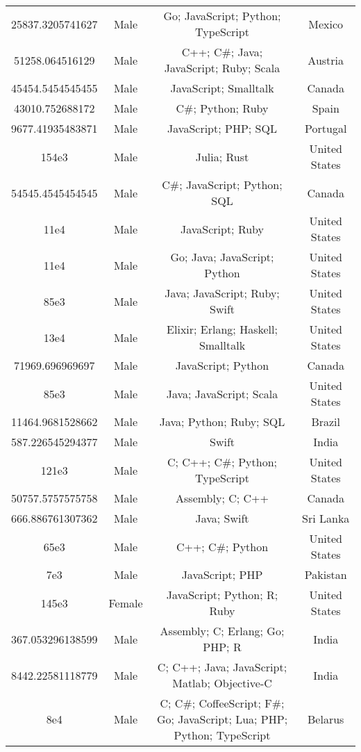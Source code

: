 \begin{center}
\begin{tabular}{ |c|c|c|c| }
25837.3205741627  &  Male  &  Go; JavaScript; Python; TypeScript  &  Mexico  \\ 
51258.064516129  &  Male  &  C++; C\#; Java; JavaScript; Ruby; Scala  &  Austria  \\ 
45454.5454545455  &  Male  &  JavaScript; Smalltalk  &  Canada  \\ 
43010.752688172  &  Male  &  C\#; Python; Ruby  &  Spain  \\ 
9677.41935483871  &  Male  &  JavaScript; PHP; SQL  &  Portugal  \\ 
154e3  &  Male  &  Julia; Rust  &  United States  \\ 
54545.4545454545  &  Male  &  C\#; JavaScript; Python; SQL  &  Canada  \\ 
11e4  &  Male  &  JavaScript; Ruby  &  United States  \\ 
11e4  &  Male  &  Go; Java; JavaScript; Python  &  United States  \\ 
85e3  &  Male  &  Java; JavaScript; Ruby; Swift  &  United States  \\ 
13e4  &  Male  &  Elixir; Erlang; Haskell; Smalltalk  &  United States  \\ 
71969.696969697  &  Male  &  JavaScript; Python  &  Canada  \\ 
85e3  &  Male  &  Java; JavaScript; Scala  &  United States  \\ 
11464.9681528662  &  Male  &  Java; Python; Ruby; SQL  &  Brazil  \\ 
587.226545294377  &  Male  &  Swift  &  India  \\ 
121e3  &  Male  &  C; C++; C\#; Python; TypeScript  &  United States  \\ 
50757.5757575758  &  Male  &  Assembly; C; C++  &  Canada  \\ 
666.886761307362  &  Male  &  Java; Swift  &  Sri Lanka  \\ 
65e3  &  Male  &  C++; C\#; Python  &  United States  \\ 
7e3  &  Male  &  JavaScript; PHP  &  Pakistan  \\ 
145e3  &  Female  &  JavaScript; Python; R; Ruby  &  United States  \\ 
367.053296138599  &  Male  &  Assembly; C; Erlang; Go; PHP; R  &  India  \\ 
8442.22581118779  &  Male  &  C; C++; Java; JavaScript; Matlab; Objective-C  &  India  \\ 
8e4  &  Male  &  C; C\#; CoffeeScript; F\#; Go; JavaScript; Lua; PHP; Python; TypeScript  &  Belarus  \\ 

\end{tabular}
\end{center}
